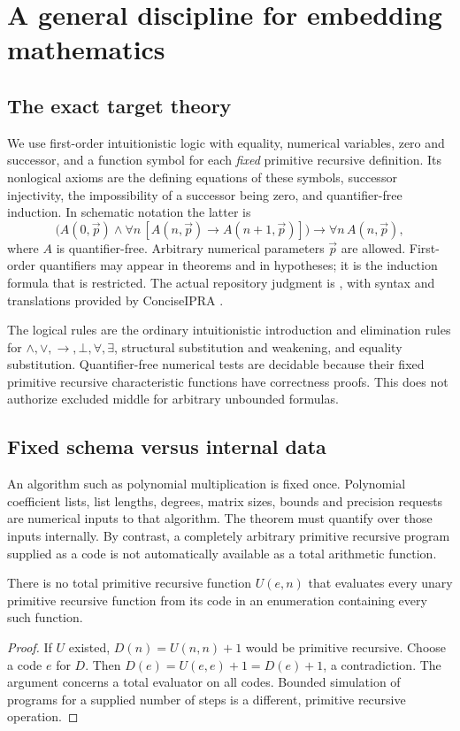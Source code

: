 \section{A general discipline for embedding mathematics}
\label{sec:framework}

\subsection{The exact target theory}

We use first-order intuitionistic logic with equality, numerical variables, zero and successor, and a function symbol for each \emph{fixed} primitive recursive definition. Its nonlogical axioms are the defining equations of these symbols, successor injectivity, the impossibility of a successor being zero, and quantifier-free induction. In schematic notation the latter is
\[
 \bigl(A(0,\vec p)\wedge
       \forall n\,[A(n,\vec p)\to A(n+1,\vec p)]\bigr)
       \to\forall n\,A(n,\vec p),
\]
where $A$ is quantifier-free. Arbitrary numerical parameters $\vec p$ are allowed. First-order quantifiers may appear in theorems and in hypotheses; it is the induction formula that is restricted. The actual repository judgment is , with syntax and translations provided by ConciseIPRA \cite{repo-concise,repo-derivations}.

The logical rules are the ordinary intuitionistic introduction and elimination rules for $\wedge,\vee,\to,\bot,\forall,\exists$, structural substitution and weakening, and equality substitution. Quantifier-free numerical tests are decidable because their fixed primitive recursive characteristic functions have correctness proofs. This does not authorize excluded middle for arbitrary unbounded formulas.

\subsection{Fixed schema versus internal data}

An algorithm such as polynomial multiplication is fixed once. Polynomial coefficient lists, list lengths, degrees, matrix sizes, bounds and precision requests are numerical inputs to that algorithm. The theorem must quantify over those inputs internally. By contrast, a completely arbitrary primitive recursive program supplied as a code is not automatically available as a total arithmetic function.

\begin{proposition}
There is no total primitive recursive function $U(e,n)$ that evaluates every unary primitive recursive function from its code in an enumeration containing every such function.
\end{proposition}
\begin{proof}
If $U$ existed, $D(n)=U(n,n)+1$ would be primitive recursive. Choose a code $e$ for $D$. Then $D(e)=U(e,e)+1=D(e)+1$, a contradiction. The argument concerns a total evaluator on all codes. Bounded simulation of programs for a supplied number of steps is a different, primitive recursive operation.
\end{proof}

